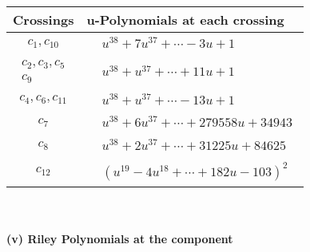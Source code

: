 \documentclass[1p]{elsarticle_modified}
\theoremstyle{definition}
\begin{document}
\begin{tabular}{m{50pt}|m{274pt}}
Crossings & \hspace{64pt}u-Polynomials at each crossing \\
\hline $$\begin{aligned}c_{1},c_{10}\end{aligned}$$&$\begin{aligned}
&u^{38}+7 u^{37}+\cdots-3 u+1
\end{aligned}$\\
\hline $$\begin{aligned}c_{2},c_{3},c_{5}\\c_{9}\end{aligned}$$&$\begin{aligned}
&u^{38}+u^{37}+\cdots+11 u+1
\end{aligned}$\\
\hline $$\begin{aligned}c_{4},c_{6},c_{11}\end{aligned}$$&$\begin{aligned}
&u^{38}+u^{37}+\cdots-13 u+1
\end{aligned}$\\
\hline $$\begin{aligned}c_{7}\end{aligned}$$&$\begin{aligned}
&u^{38}+6 u^{37}+\cdots+279558 u+34943
\end{aligned}$\\
\hline $$\begin{aligned}c_{8}\end{aligned}$$&$\begin{aligned}
&u^{38}+2 u^{37}+\cdots+31225 u+84625
\end{aligned}$\\
\hline $$\begin{aligned}c_{12}\end{aligned}$$&$\begin{aligned}
&(u^{19}-4 u^{18}+\cdots+182 u-103)^{2}
\end{aligned}$\\
\hline
\end{tabular}\\~\\
\newpage\renewcommand{\arraystretch}{1}
\flushleft \textbf{(v) Riley Polynomials at the component}\newline \\
\end{document}
